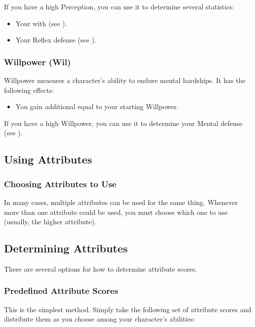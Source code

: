             If you have a high Perception, you can use it to determine several statistics:
            \begin{itemize}
                \item Your  with  (see ).
                \item Your Reflex defense (see ).
            \end{itemize}

        \subsubsection{Willpower (Wil)}\label{Willpower}
            Willpower measures a character's ability to endure mental hardships.
            It has the following effects:
            \begin{itemize}
                \item You gain additional  equal to your starting Willpower.
            \end{itemize}

            If you have a high Willpower, you can use it to determine your Mental defense (see ).

    \subsection{Using Attributes}

        \subsubsection{Choosing Attributes to Use}
            In many cases, multiple attributes can be used for the same thing.
            Whenever more than one attribute could be used, you must choose which one to use (usually, the higher attribute).

    \subsection{Determining Attributes}
        There are several options for how to determine attribute scores.

        \subsubsection{Predefined Attribute Scores}
            This is the simplest method.
            Simply take the following set of attribute scores and distribute them as you choose among your character's abilities:

